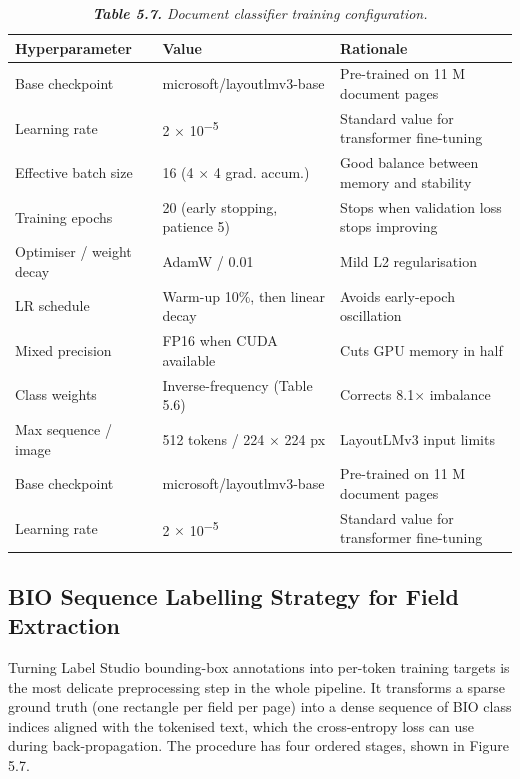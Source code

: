 \begin{table}[H]
  \centering
  \caption{\textit{\textbf{Table 5.7.} Document classifier training configuration.}}
  \renewcommand{\arraystretch}{1.0}
  \begin{tabularx}{\textwidth}{|X|X|X|}
    \hline
    \textbf{Hyperparameter} & \textbf{Value} & \textbf{Rationale} \\ \hline
    Base checkpoint & microsoft/layoutlmv3-base & Pre-trained on 11 M document pages \\ \hline
    Learning rate & 2 $\times$ 10\textsuperscript{$-$}\textsuperscript{5} & Standard value for transformer fine-tuning \\ \hline
    Effective batch size & 16 (4 $\times$ 4 grad. accum.) & Good balance between memory and stability \\ \hline
    Training epochs & 20 (early stopping, patience 5) & Stops when validation loss stops improving \\ \hline
    Optimiser / weight decay & AdamW / 0.01 & Mild L2 regularisation \\ \hline
    LR schedule & Warm-up 10\%, then linear decay & Avoids early-epoch oscillation \\ \hline
    Mixed precision & FP16 when CUDA available & Cuts GPU memory in half \\ \hline
    Class weights & Inverse-frequency (Table 5.6) & Corrects 8.1$\times$ imbalance \\ \hline
    Max sequence / image & 512 tokens / 224 $\times$ 224 px & LayoutLMv3 input limits \\ \hline
    Base checkpoint & microsoft/layoutlmv3-base & Pre-trained on 11 M document pages \\ \hline
    Learning rate & 2 $\times$ 10\textsuperscript{$-$}\textsuperscript{5} & Standard value for transformer fine-tuning \\ \hline
  \end{tabularx}
\end{table}

\subsection{BIO Sequence Labelling Strategy for Field Extraction}

Turning Label Studio bounding-box annotations into per-token training targets is the most delicate preprocessing step in the whole pipeline. It transforms a sparse ground truth (one rectangle per field per page) into a dense sequence of BIO class indices aligned with the tokenised text, which the cross-entropy loss can use during back-propagation. The procedure has four ordered stages, shown in Figure 5.7.

